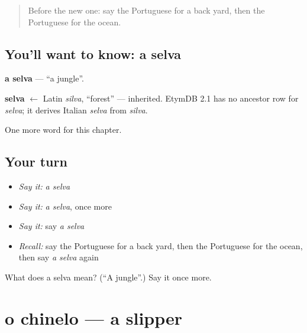 \label{lesson:PT-C255-selva}



\begin{quote}
Before the new one: say the Portuguese for a back yard, then the Portuguese for the ocean.
\end{quote}

\subsection*{You'll want to know: a selva}
\textbf{a selva} — \textquotedblleft{}a jungle\textquotedblright{}.

\begin{cousinweb}
\textbf{selva} $\leftarrow$ Latin \emph{silva}, \textquotedblleft{}forest\textquotedblright{} — inherited. EtymDB 2.1 has no ancestor row for \emph{selva}; it derives Italian \emph{selva} from \emph{silva}.
\end{cousinweb}

\begin{grammarlens}[title={What you've built}]
One more word for this chapter.
\end{grammarlens}

\subsection*{Your turn}
\begin{itemize}
\raggedright
  \item \emph{Say it:} \emph{a selva}
  \item \emph{Say it:} \emph{a selva}, once more
  \item \emph{Say it:} say \emph{a selva}
  \item \emph{Recall:} say the Portuguese for a back yard, then the Portuguese for the ocean, then say \emph{a selva} again
\end{itemize}

\begin{tcolorbox}[breakable,colback=teal!4,colframe=teal!35!black,title={Before you move on}]
What does a selva mean? (\textquotedblleft{}A jungle\textquotedblright{}.) Say it once more.
\end{tcolorbox}
\section[o chinelo]{o chinelo — a slipper}

\label{lesson:PT-C255-chinelo}




